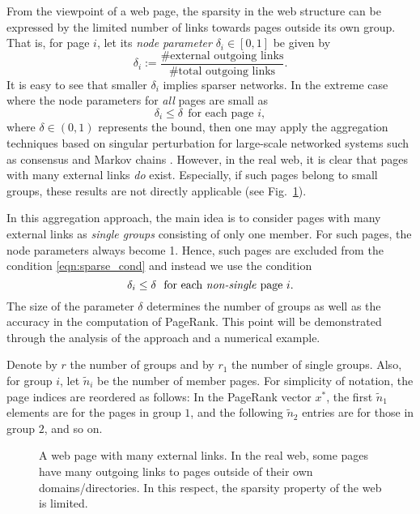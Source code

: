 \documentclass[11pt,draftcls,onecolumn]{IEEEtran}
\begin{document}
From the viewpoint of a web page, the sparsity in the web structure can be
expressed by the limited number of links towards pages outside its own group.
That is, for page $i$, let its \textit{node parameter} $\delta_i\in[0,1]$ be given by
\begin{equation}
   \delta_i := \frac{\text{\# external outgoing links}}{\text{\# total outgoing links}}.
\label{eqn:node_par}
\end{equation}
It is easy to see that smaller $\delta_i$ implies sparser networks. 
In the extreme case where the node parameters for \textit{all} pages are small as
\begin{equation}
   \delta_i \leq \delta~~\text{for each page $i$},
 \label{eqn:sparse_cond}
\end{equation}
where $\delta\in(0,1)$ represents the bound, 
then one may apply the aggregation techniques based on singular perturbation
for large-scale networked systems such as consensus and Markov chains
\cite{PhiKok:81,AldKha:91,BiyArc:08,ChoKok:85}.
However, in the real web, it is clear that pages with many external links
\textit{do} exist. Especially, if such pages belong to small groups, 
these results are not directly applicable (see Fig.~\ref{fig:aggregation2}).

In this aggregation approach, the main idea is to consider pages with many external links as
\textit{single groups} consisting of only one member. For such pages, the node parameters
always become 1.  Hence, such pages are excluded from the condition 
\eqref{eqn:sparse_cond} and instead we use the condition
\begin{equation}
   \delta_i \leq \delta~~\text{for each \textit{non-single} page $i$}.
 \label{eqn:sparse_cond2}
\end{equation}
The size of the parameter $\delta$ determines the number of groups
as well as the accuracy in the computation of PageRank. This point will
be demonstrated through the analysis of the approach and a numerical example. 

Denote by $r$ the number of groups and by $r_1$ the number of single groups. 
Also, for group $i$, let $\widetilde{n}_i$ be the number of member pages. 
For simplicity of notation, the page indices are reordered as follows:
In the PageRank vector $x^*$, the first $\widetilde{n}_1$ 
elements are for the pages in group $1$, and the following $\widetilde{n}_2$ entries are 
for those in group $2$, and so on.

\begin{figure}
  \centering
  \caption{A web page with many external links. In the real web, some pages have many
    outgoing links to pages outside of their own domains/directories. 
    In this respect, the sparsity property of the web is limited.}
  \label{fig:aggregation2}  
\end{figure}
\end{document}
